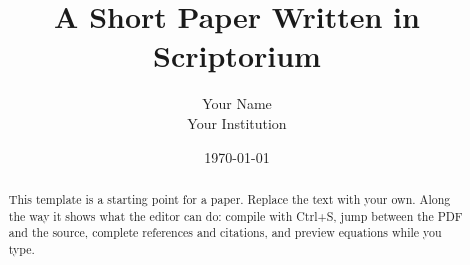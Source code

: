 \documentclass[11pt]{article}
\title{A Short Paper Written in Scriptorium}
\author{Your Name\\\small Your Institution}
\date{\today}
\begin{document}
\maketitle

\begin{abstract}
This template is a starting point for a paper. Replace the text with your own. Along the way it shows what the
editor can do: compile with Ctrl+S, jump between the PDF and the source, complete references and citations, and
preview equations while you type.
\end{abstract}







\end{document}
